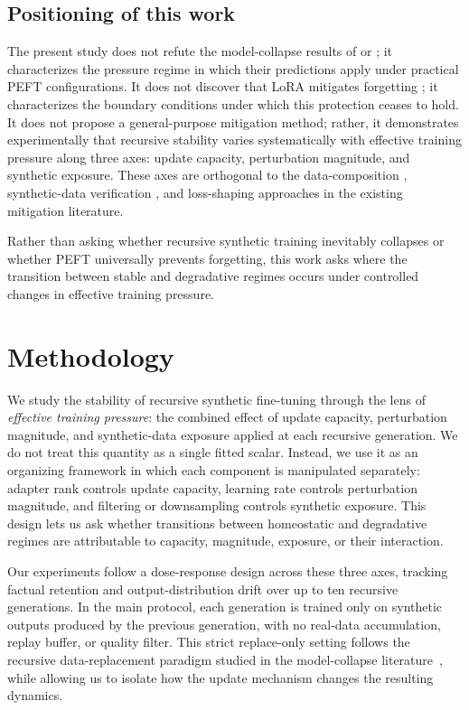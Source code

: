 \documentclass[a4paper,fleqn]{cas-dc}
\begin{document}
\subsection{Positioning of this work}

The present study does not refute the model-collapse results of
\citet{shumailov2024} or \citet{dohmatob2025}; it characterizes the pressure
regime in which their predictions apply under practical PEFT configurations. It
does not discover that LoRA mitigates forgetting \citep{biderman2024}; it
characterizes the boundary conditions under which this protection ceases to
hold. It does not propose a general-purpose mitigation method; rather, it
demonstrates experimentally that recursive stability varies systematically with
effective training pressure along three axes: update capacity, perturbation
magnitude, and synthetic exposure. These axes are orthogonal to the
data-composition \citep{gerstgrasser2024}, synthetic-data verification
\citep{yi2025}, and loss-shaping \citep{zibakhsh2024} approaches in the
existing mitigation literature.

Rather than asking whether recursive synthetic training inevitably collapses or
whether PEFT universally prevents forgetting, this work asks where the
transition between stable and degradative regimes occurs under controlled
changes in effective training pressure.

\section{Methodology}\label{sec:methodology}

We study the stability of recursive synthetic fine-tuning through the lens of
\textit{effective training pressure}: the combined effect of update capacity,
perturbation magnitude, and synthetic-data exposure applied at each recursive
generation. We do not treat this quantity as a single fitted scalar. Instead, we
use it as an organizing framework in which each component is manipulated
separately: adapter rank controls update capacity, learning rate controls
perturbation magnitude, and filtering or downsampling controls synthetic
exposure. This design lets us ask whether transitions between homeostatic and
degradative regimes are attributable to capacity, magnitude, exposure, or their
interaction.

Our experiments follow a dose-response design across these three axes, tracking
factual retention and output-distribution drift over up to ten recursive
generations. In the main protocol, each generation is trained only on synthetic
outputs produced by the previous generation, with no real-data accumulation,
replay buffer, or quality filter. This strict replace-only setting follows the
recursive data-replacement paradigm studied in the model-collapse
literature~\citep{shumailov2024,dohmatob2025,gerstgrasser2024}, while allowing
us to isolate how the update mechanism changes the resulting dynamics.
\end{document}

